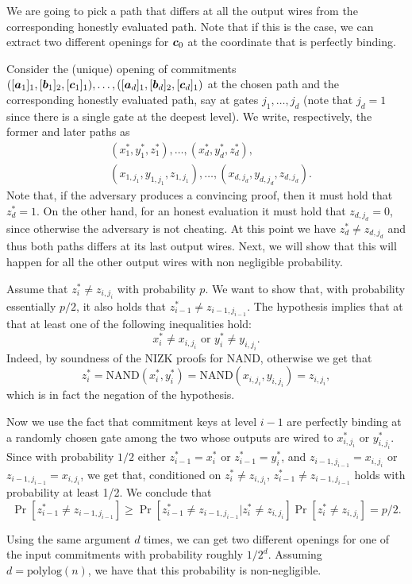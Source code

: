 We are going to pick a path that differs at all the output wires from the corresponding honestly evaluated path. Note that if this is the case, we can extract two different openings for ${\boldsymbol{c}}_0$ at the coordinate that is perfectly binding.

Consider the (unique) opening of commitments $([{\boldsymbol{a}}_1]_1,\allowbreak [{\boldsymbol{b}}_1]_2,\allowbreak[{\boldsymbol{c}}_1]_1),\ldots,([{\boldsymbol{a}}_d]_1,\allowbreak[{\boldsymbol{b}}_d]_2,[{\boldsymbol{c}}_d]_1)$ at the chosen path and the corresponding honestly evaluated path, say at gates $j_1,\ldots,j_d$ (note that $j_d=1$ since there is a single gate at the deepest level). We write, respectively, the former and later paths as
\begin{align*}
&(x^*_{1},y^*_{1},z^*_{1}),\ldots,(x^*_{d},y^*_{d},z^*_{d}),\\
&(x_{1,j_1},y_{1,j_1},z_{1,j_1}),\ldots,(x_{d,j_d},y_{d,j_d},z_{d,j_d}).
\end{align*}
Note that, if the adversary produces a convincing proof, then it must hold that $z^*_{d}=1$. On the other hand, for an honest evaluation it must hold that $z_{d,j_d}=0$, since otherwise the adversary is not cheating.
At this point we have $z^*_{d}\neq z_{d,j_d}$ and thus both paths differs at its last output wires. Next, we will show that this will happen for all the other output wires with non negligible probability.

Assume that $z^*_{i}\neq z_{i,j_i}$ with probability $p$. We want to show that, with probability essentially $p/2$, it also holds that $z^*_{i-1}\neq z_{i-1,j_{i-1}}$. The hypothesis implies that at that at least one of the following inequalities hold:
$$x^*_{i}\neq x_{i,j_i}\text{ or }y^*_{i}\neq y_{i,j_i}.$$ 
Indeed, by soundness of the NIZK proofs for NAND, otherwise we get that
$$z^*_{i} = \mathrm{NAND}(x^*_{i},y^*_{i})  = \mathrm{NAND}(x_{i,j_i},y_{i,j_i})=z_{i,j_i},$$
which is in fact the negation of the hypothesis. 

Now we use the fact that commitment keys at level $i-1$ are perfectly binding at a randomly chosen gate among the two whose outputs are wired to $x^*_{i,j_i}$ or $y^*_{i,j_i}$. Since with probability $1/2$ either $z^*_{i-1}=x^*_{i}$ or $z^*_{i-1}=y^*_{i}$, and $z_{i-1,j_{i-1}}=x_{i,j_i}$ or $z_{i-1,j_{i-1}}=x_{i,j_i}$, we get that, conditioned on $z^*_{i}\neq z_{i,j_i}$, $z^*_{i-1}\neq z_{i-1,j_{i-1}}$ holds with probability at least 1/2. We conclude that 
$$
\Pr[z^*_{i-1}\neq z_{i-1,j_{i-1}}] \geq \Pr[z^*_{i-1}\neq z_{i-1,j_{i-1}}|z^*_{i}\neq z_{i,j_i}]\Pr[z^*_{i}\neq z_{i,j_i}] = p/2.
$$

Using the same argument $d$ times, we can get two different openings for one of the input commitments with probability roughly $1/2^d$. Assuming $d=\mathrm{polylog}(n)$, we have that this probability is non-negligible.